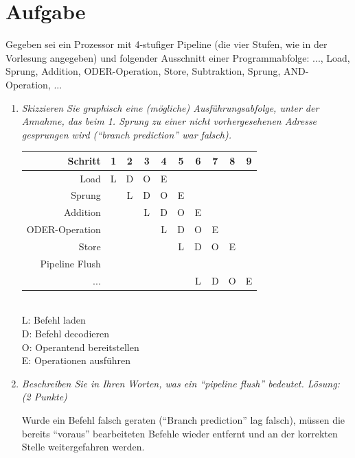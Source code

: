 \documentclass[10pt]{article}
\begin{document}
\section{Aufgabe}
Gegeben sei ein Prozessor mit 4-stufiger Pipeline (die vier Stufen, wie in der Vorlesung angegeben) und folgender Ausschnitt einer Programmabfolge: 
..., Load, Sprung, Addition, ODER-Operation, Store, Subtraktion, Sprung, AND-Operation, ...
\begin{enumerate}[label=\alph*)]
	\item 
	\textit{Skizzieren Sie graphisch eine (mögliche) Ausführungsabfolge, unter der Annahme, das beim 1. Sprung zu einer nicht vorhergesehenen Adresse gesprungen wird ("`branch prediction"' war falsch).}
	
	\begin{tabular}{r | c | c | c | c | c | c | c | c | c }
	Schritt & 1 & 2 & 3 & 4 & 5 & 6 & 7 & 8 & 9\\
	\hline
	Load		&	L	&	D	&	O	&	E	\\
	Sprung		&	&	L	&	D	&	O	& 	E 	\\
	Addition	&	&	&	L	&	D	&	O	&	E	\\
	ODER-Operation	&	&	&	&	L	&	D	&	O	&	E	\\
	Store	&	&	&	&	&	L	&	D	&	O	&	E	\\
	Pipeline Flush &	&	&	&	&	&	&	&	&\\
	...		&	&	&	&	&	&	L	&	D	&	O	&	E	\\
	\end{tabular}\\
	L: Befehl laden\\
	D: Befehl decodieren\\
	O: Operantend bereitstellen\\
	E: Operationen ausführen\\
	\item 
	\textit{Beschreiben Sie in Ihren Worten, was ein "`pipeline flush"' bedeutet. Lösung: (2 Punkte) }
	
	Wurde ein Befehl falsch geraten ("`Branch prediction"' lag falsch), müssen die bereits "`voraus"' bearbeiteten Befehle wieder entfernt und an der korrekten Stelle weitergefahren werden.
	
\end{enumerate}
\newpage

\end{document}
